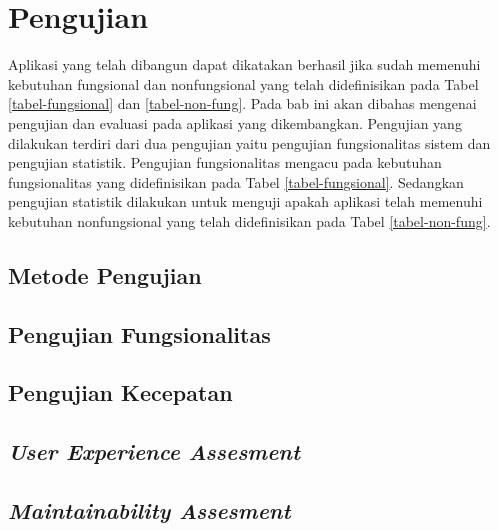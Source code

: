 \section{Pengujian}
	Aplikasi yang telah dibangun dapat dikatakan berhasil jika sudah memenuhi kebutuhan fungsional dan nonfungsional yang telah didefinisikan pada Tabel \ref{tabel-fungsional} dan \ref{tabel-non-fung}. Pada bab ini akan dibahas mengenai pengujian dan evaluasi pada aplikasi yang dikembangkan. Pengujian yang dilakukan terdiri dari dua pengujian yaitu pengujian fungsionalitas sistem dan pengujian statistik. Pengujian fungsionalitas mengacu pada kebutuhan fungsionalitas yang didefinisikan pada Tabel \ref{tabel-fungsional}. Sedangkan pengujian statistik dilakukan untuk menguji apakah aplikasi telah memenuhi kebutuhan nonfungsional yang telah didefinisikan pada Tabel \ref{tabel-non-fung}.

	
	\subsection{Metode Pengujian}
	
		
	\subsection{Pengujian Fungsionalitas}
	\label{uji-fungsional}
	
	
	\subsection{Pengujian Kecepatan}
	\label{uji-performa}
	
	
	\subsection{\textit{User Experience Assesment}}
	\label{uji-userexperience}
	
	
	\subsection{\textit{Maintainability Assesment}}
	\label{uji-maintainability}
	
	
	
		
		

